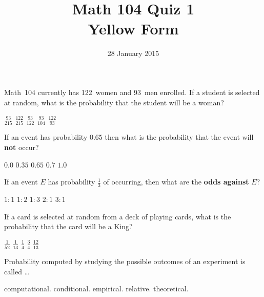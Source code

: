 \documentclass[answers,12pt]{exam}
\title{Math 104 Quiz 1\\Yellow Form}
\date{28 January 2015}
\begin{document}
\maketitle
\begin{center}
\end{center}

\begin{questions}
\question Math~104 currently has 122~women and 93~men enrolled.
If a student is selected at random, what is the probability
that the student will be a woman?\\
\begin{oneparchoices}
\choice $\frac{93}{215}$
\correctchoice $\frac{122}{215}$
\choice $\frac{93}{122}$
\choice $\frac{93}{104}$
\choice $\frac{122}{93}$
\end{oneparchoices}

\question If an event has probability $0.65$
then what is the probability that the event will
{\bf not} occur?\\
\begin{oneparchoices}
\choice $0.0$
\correctchoice $0.35$
\choice $0.65$
\choice $0.7$
\choice $1.0$
\end{oneparchoices}

\question If an event $E$ has probability $\frac{1}{3}$
of occurring, then what are the {\bf odds against} $E$?\\
\begin{oneparchoices}
\choice $1:1$
\choice $1:2$ %
\choice $1:3$ %
\correctchoice $2:1$
\choice $3:1$ %
\end{oneparchoices}

\question If a card is selected at random from a deck of
playing cards, what is the probability that
the card will be a King?\\
\begin{oneparchoices}
\choice $\frac{1}{52}$
\correctchoice $\frac{1}{13}$
\choice $\frac{1}{4}$
\choice $\frac{3}{4}$
\choice $\frac{12}{13}$
\end{oneparchoices}

\question Probability computed by studying
the possible outcomes of an experiment is called \dots\\
\begin{oneparchoices}
\choice computational.
\choice conditional.
\choice empirical.
\choice relative.
\correctchoice theoretical.
\end{oneparchoices}


\end{questions}
\end{document}
